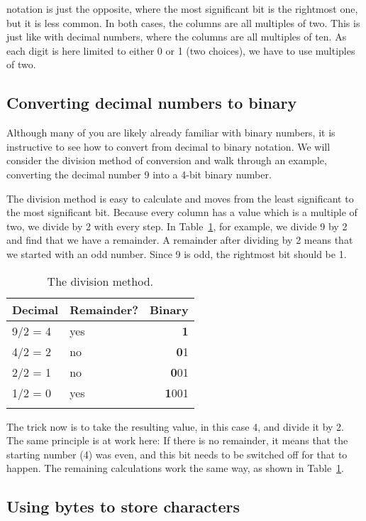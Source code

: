  notation is just the opposite, where the most
significant bit is the rightmost one, but it is less common.
In both cases, the columns are all multiples of two.  This is just
like with decimal numbers, where the columns are all multiples of ten.
As each digit is here limited to either 0 or 1 (two choices), we have
to use multiples of two.

\subsection{Converting decimal numbers to binary}

Although many of you are likely already familiar with binary numbers,
it is instructive to see how to convert from decimal to
binary notation.  
We will consider the division method of conversion and walk through an
example, converting the decimal number 9 into a 4-bit binary number.

The division method is easy to calculate and moves from the least significant 
to the most significant bit.  Because every column has a value which is a multiple of
two, we divide by 2 with every step.  In
Table~\ref{fig:bit-division}, for example, we divide 9 by 2 and find
that we have a remainder.  A remainder after dividing by 2 means that
we started with an odd number.  Since 9 is odd, the rightmost bit
should be 1.

\begin{table}
\begin{tabular}{llr}
\lsptoprule
Decimal & Remainder? & Binary\\
\midrule
9/2 = 4 & yes & \textbf{1}\\
4/2 = 2 & no & \textbf{0}1\\
2/2 = 1 & no & \textbf{0}01\\
1/2 = 0 & yes & \textbf{1}001\\
\lspbottomrule
\end{tabular}
\caption{The division method.}
\label{fig:bit-division}
\end{table}

The trick now is to take the resulting value, in this case 4, and
divide it by 2.  The same principle is at work here: If there is no
remainder, it means that the starting number (4) was even, and this
bit needs to be switched off for that to happen. The remaining calculations work the same way, as shown in Table~\ref{fig:bit-division}.


\subsection{Using bytes to store characters}
\label{sec:bytes}

